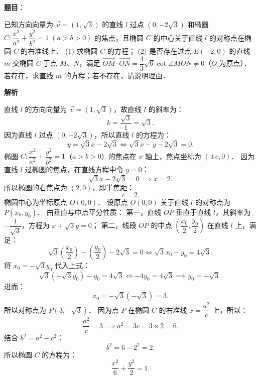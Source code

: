 \begin{answer}

\textbf{题目}：

已知方向向量为 $\vec{v} = (1, \sqrt{3})$ 的直线 $l$ 过点 $(0, -2\sqrt{3})$ 和椭圆 $C: \dfrac{x^2}{a^2} + \dfrac{y^2}{b^2} = 1 \; (a > b > 0)$ 的焦点，且椭圆 $C$ 的中心关于直线 $l$ 的对称点在椭圆 $C$ 的右准线上．
(1) 求椭圆 $C$ 的方程；
(2) 是否存在过点 $E(-2, 0)$ 的直线 $m$ 交椭圆 $C$ 于点 $M$、$N$，满足 $\overrightarrow{OM} \cdot \overrightarrow{ON} = \dfrac{4}{3}\sqrt{6}\cot\angle MON \neq 0$（$O$ 为原点）．若存在，求直线 $m$ 的方程；若不存在，请说明理由．

\textbf{解析}


直线 $l$ 的方向向量为 $\vec{v} = (1, \sqrt{3})$，故直线 $l$ 的斜率为：
\nopagebreak[4]
\[
k = \frac{\sqrt{3}}{1} = \sqrt{3}.
\]
因为直线 $l$ 过点 $(0, -2\sqrt{3})$，所以直线 $l$ 的方程为：
\nopagebreak[4]
\[
y = \sqrt{3}x - 2\sqrt{3} \iff \sqrt{3}x - y - 2\sqrt{3} = 0.
\]
椭圆 $C: \dfrac{x^2}{a^2} + \dfrac{y^2}{b^2} = 1$（$a > b > 0$）的焦点在 $x$ 轴上，焦点坐标为 $(\pm c, 0)$．
因为直线 $l$ 过椭圆的焦点，在直线方程中令 $y = 0$：
\nopagebreak[4]
\[
\sqrt{3}x - 2\sqrt{3} = 0 \implies x = 2.
\]
所以椭圆的右焦点为 $(2, 0)$，即半焦距：
\nopagebreak[4]
\[
c = 2.
\]
椭圆中心为坐标原点 $O(0, 0)$．
设原点 $O(0, 0)$ 关于直线 $l$ 的对称点为 $P(x_0, y_0)$．
由垂直与中点平分性质：
第一，直线 $OP$ 垂直于直线 $l$，其斜率为 $-\dfrac{1}{\sqrt{3}}$，方程为 $x + \sqrt{3}y = 0$；
第二，线段 $OP$ 的中点 $\left(\dfrac{x_0}{2}, \dfrac{y_0}{2}\right)$ 在直线 $l$ 上，满足：
\nopagebreak[4]
\[
\sqrt{3}\left(\frac{x_0}{2}\right) - \left(\frac{y_0}{2}\right) - 2\sqrt{3} = 0 \iff \sqrt{3}x_0 - y_0 = 4\sqrt{3}.
\]
将 $x_0 = -\sqrt{3}y_0$ 代入上式：
\nopagebreak[4]
\[
\sqrt{3}(-\sqrt{3}y_0) - y_0 = 4\sqrt{3} \iff -4y_0 = 4\sqrt{3} \implies y_0 = -\sqrt{3}.
\]
进而：
\nopagebreak[4]
\[
x_0 = -\sqrt{3}(-\sqrt{3}) = 3.
\]
所以对称点为 $P(3, -\sqrt{3})$．
因为点 $P$ 在椭圆 $C$ 的右准线 $x = \dfrac{a^2}{c}$ 上，所以：
\nopagebreak[4]
\[
\frac{a^2}{c} = 3 \implies a^2 = 3c = 3 \times 2 = 6.
\]
结合 $b^2 = a^2 - c^2$：
\nopagebreak[4]
\[
b^2 = 6 - 2^2 = 2.
\]
所以椭圆 $C$ 的方程为：
\nopagebreak[4]
\[
\frac{x^2}{6} + \frac{y^2}{2} = 1.
\]


\end{answer}
